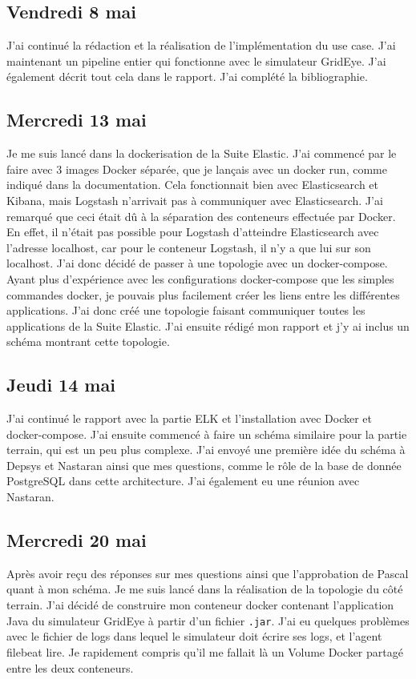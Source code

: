 \documentclass[paper=a4, fontsize=11pt]{scrartcl}
\begin{document}
\subsection{Vendredi 8 mai}
    J'ai continué la rédaction et la réalisation de l'implémentation du use case. J'ai maintenant un pipeline entier qui fonctionne avec le simulateur GridEye. J'ai également décrit tout cela dans le rapport. J'ai complété la bibliographie.
\subsection{Mercredi 13 mai}
    Je me suis lancé dans la dockerisation de la Suite Elastic. J'ai commencé par le faire avec 3 images Docker séparée, que je lançais avec un docker run, comme indiqué dans la documentation. Cela fonctionnait bien avec Elasticsearch et Kibana, mais Logstash n'arrivait pas à communiquer avec Elasticsearch. J'ai remarqué que ceci était dû à la séparation des conteneurs effectuée par Docker. En effet, il n'était pas possible pour Logstash d'atteindre Elasticsearch avec l'adresse localhost, car pour le conteneur Logstash, il n'y a que lui sur \og son \fg localhost. J'ai donc décidé de passer à une topologie avec un docker-compose. Ayant plus d'expérience avec les configurations docker-compose que les simples commandes docker, je pouvais plus facilement créer les liens entre les différentes applications. J'ai donc créé une topologie faisant communiquer toutes les applications de la Suite Elastic. J'ai ensuite rédigé mon rapport et j'y ai inclus un schéma montrant cette topologie.
\subsection{Jeudi 14 mai}
    J'ai continué le rapport avec la partie ELK et l'installation avec Docker et docker-compose. J'ai ensuite commencé à faire un schéma similaire pour la partie terrain, qui est un peu plus complexe. J'ai envoyé une première idée du schéma à Depsys et Nastaran ainsi que mes questions, comme le rôle de la base de donnée PostgreSQL dans cette architecture. J'ai également eu une réunion avec Nastaran.
\subsection{Mercredi 20 mai}
    Après avoir reçu des réponses sur mes questions ainsi que l'approbation de Pascal quant à mon schéma. Je me suis lancé dans la réalisation de la topologie du côté terrain. J'ai décidé de construire mon conteneur docker contenant l'application Java du simulateur GridEye à partir d'un fichier \verb,.jar,. J'ai eu quelques problèmes avec le fichier de logs dans lequel le simulateur doit écrire ses logs, et l'agent filebeat lire. Je rapidement compris qu'il me fallait là un Volume Docker partagé entre les deux conteneurs.
\end{document}
